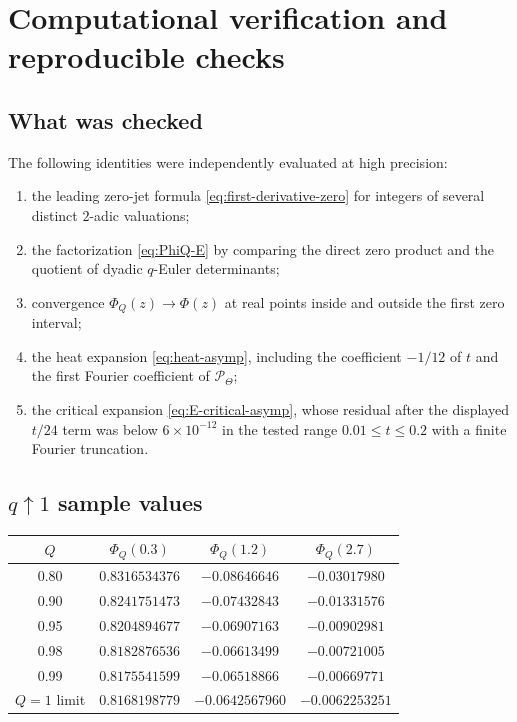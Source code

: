 \documentclass[11pt,oneside]{article}
\numberwithin{equation}{section}
\theoremstyle{plain}
\theoremstyle{definition}
\theoremstyle{remark}
\newcommand{\Pcal}{\mathcal P}
\begin{document}
\section{Computational verification and reproducible checks}

\subsection{What was checked}

The following identities were independently evaluated at high precision:
\begin{enumerate}[leftmargin=2em]
\item the leading zero-jet formula \cref{eq:first-derivative-zero} for integers of several distinct $2$-adic valuations;
\item the factorization \cref{eq:PhiQ-E} by comparing the direct zero product and the quotient of dyadic $q$-Euler determinants;
\item convergence $\Phi_Q(z)\to\Phi(z)$ at real points inside and outside the first zero interval;
\item the heat expansion \cref{eq:heat-asymp}, including the coefficient $-1/12$ of $t$ and the first Fourier coefficient of $\Pcal_\Theta$;
\item the critical expansion \cref{eq:E-critical-asymp}, whose residual after the displayed $t/24$ term was below $6\times10^{-12}$ in the tested range $0.01\le t\le0.2$ with a finite Fourier truncation.
\end{enumerate}

\subsection{$q\uparrow1$ sample values}

\begin{center}
\small
\begin{tabular}{@{}c|ccc@{}}
\toprule
$Q$ & $\Phi_Q(0.3)$ & $\Phi_Q(1.2)$ & $\Phi_Q(2.7)$\\
\midrule
0.80 & $0.8316534376$ & $-0.08646646$ & $-0.03017980$\\
0.90 & $0.8241751473$ & $-0.07432843$ & $-0.01331576$\\
0.95 & $0.8204894677$ & $-0.06907163$ & $-0.00902981$\\
0.98 & $0.8182876536$ & $-0.06613499$ & $-0.00721005$\\
0.99 & $0.8175541599$ & $-0.06518866$ & $-0.00669771$\\
\midrule
$Q=1$ limit & $0.8168198779$ & $-0.0642567960$ & $-0.0062253251$\\
\bottomrule
\end{tabular}
\end{center}
\end{document}
